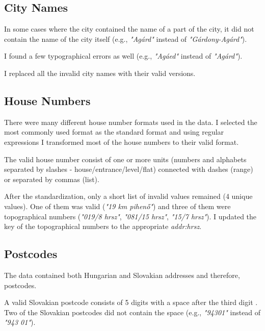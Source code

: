 \documentclass{article}
\begin{document}
\begin{multicols}{2}
\subsection{City Names}

In some cases where the city contained the name of a part of the city, it did not contain the name of the city itself (e.g., \textit{"Agárd"} instead of \textit{"Gárdony-Agárd"}).

I found a few typographical errors as well (e.g., \textit{"Agáed"} instead of \textit{"Agárd"}).

I replaced all the invalid city names with their valid versions.


\subsection{House Numbers}

There were many different house number formats used in the data. I selected the most commonly used format as the standard format and  using regular expressions I transformed most of the house numbers to their valid format.

The valid house number consist of one or more units (numbers and alphabets separated by slashes - house/entrance/level/flat) connected with dashes (range) or separated by commas (list).

After the standardization, only a short list of invalid values remained (4 unique values). One of them was valid (\textit{"19 km pihenő"}) and three of them were topographical numbers (\textit{"019/8 hrsz"}, \textit{"081/15 hrsz"}, \textit{"15/7 hrsz"}). I updated the key of the topographical numbers to the appropriate \textit{addr:hrsz}.


\subsection{Postcodes}

The data contained both Hungarian and Slovakian addresses and therefore, postcodes.

A valid Slovakian postcode consists of 5 digits with a space after the third digit \cite{SlovakianPostcodes:2015}. Two of the Slovakian postcodes did not contain the space (e.g., \textit{"94301"} instead of \textit{"943 01"}). 


\end{multicols}
\end{document}
